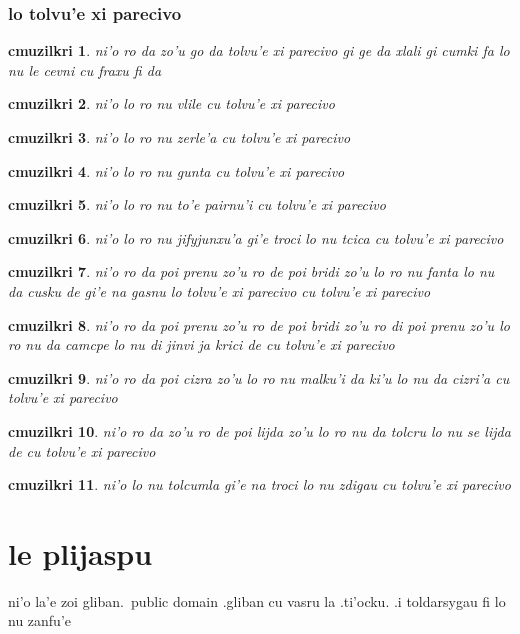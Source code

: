\documentclass{report}
\newtheorem{cmuzilkri}{cmuzilkri}
\begin{document}
\subsection{lo tolvu'e xi parecivo}
\begin{cmuzilkri}
	ni'o ro da zo'u go da tolvu'e xi parecivo gi ge da xlali gi cumki fa lo nu le cevni cu fraxu fi da
\end{cmuzilkri}
\begin{cmuzilkri}
	ni'o lo ro nu vlile cu tolvu'e xi parecivo
\end{cmuzilkri}
\begin{cmuzilkri}
	ni'o lo ro nu zerle'a cu tolvu'e xi parecivo
\end{cmuzilkri}
\begin{cmuzilkri}
	ni'o lo ro nu gunta cu tolvu'e xi parecivo
\end{cmuzilkri}
\begin{cmuzilkri}
	ni'o lo ro nu to'e pairnu'i cu tolvu'e xi parecivo
\end{cmuzilkri}
\begin{cmuzilkri}
	ni'o lo ro nu jifyjunxu'a gi'e troci lo nu tcica cu tolvu'e xi parecivo
\end{cmuzilkri}
\begin{cmuzilkri}
	ni'o ro da poi prenu zo'u ro de poi bridi zo'u lo ro nu fanta lo nu da cusku de gi'e na gasnu lo tolvu'e xi parecivo cu tolvu'e xi parecivo
\end{cmuzilkri}
\begin{cmuzilkri}
	ni'o ro da poi prenu zo'u ro de poi bridi zo'u ro di poi prenu zo'u lo ro nu da camcpe lo nu di jinvi ja krici de cu tolvu'e xi parecivo
\end{cmuzilkri}
\begin{cmuzilkri}
	ni'o ro da poi cizra zo'u lo ro nu malku'i da ki'u lo nu da cizri'a cu tolvu'e xi parecivo
\end{cmuzilkri}
\begin{cmuzilkri}
	ni'o ro da zo'u ro de poi lijda zo'u lo ro nu da tolcru lo nu se lijda de cu tolvu'e xi parecivo
\end{cmuzilkri}
\begin{cmuzilkri}
	ni'o lo nu tolcumla gi'e na troci lo nu zdigau cu tolvu'e xi parecivo
\end{cmuzilkri}

\chapter{le plijaspu}
ni'o la'e zoi gliban.\ public domain .gliban cu vasru la .ti'ocku.  .i toldarsygau fi lo nu zanfu'e
\end{document}
